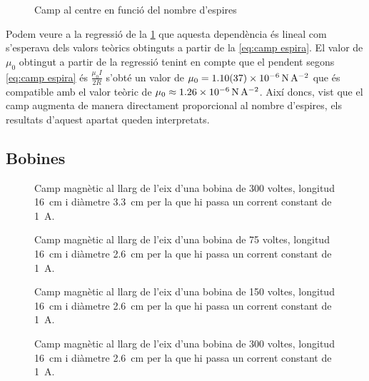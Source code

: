 \begin{figure}[htb]
  \centering
  \caption{Camp al centre en funció del nombre d'espires}
  \label{fig:camp vs n}
\end{figure}

Podem veure a la regressió de la \cref{fig:camp vs n} que aquesta dependència és lineal com s'esperava dels valors teòrics obtinguts a partir de la \cref{eq:camp espira}. El valor de $\mu_{0}$ obtingut a partir de la regressió tenint en compte que el pendent segons \cref{eq:camp espira} és $\frac{\mu_{0}I}{2R}$  s'obté un valor de $\mu_{0} = \data{1.10}{0.37d-6}{N.A^{-2}} $ que és compatible amb el valor teòric de $\mu_{0}\approx \SI{1.26d-6}{N.A^{-2}} $. Així doncs, vist que el camp augmenta de manera directament proporcional al nombre d'espires, els resultats d'aquest apartat queden interpretats.

\subsection{Bobines}\label{sec:bobines}
\begin{figure}[tp]
	\sffamily \small
	\centering
	
	\caption{Camp magnètic al llarg de l'eix d'una bobina de 300 voltes, longitud \SI{16}{cm} i diàmetre \SI{3.3}{cm} per la que hi passa un corrent constant de \SI{1}{A}.}
	\label{fig:camp 300/33}
\end{figure}

\begin{figure}[tp]
	\sffamily \small
	\centering
	
	\caption{Camp magnètic al llarg de l'eix d'una bobina de 75 voltes, longitud \SI{16}{cm} i diàmetre \SI{2.6}{cm} per la que hi passa un corrent constant de \SI{1}{A}.}
	\label{fig:camp 75/26}
\end{figure}

\begin{figure}[tp]
	\sffamily \small
	\centering
	
	\caption{Camp magnètic al llarg de l'eix d'una bobina de 150 voltes, longitud \SI{16}{cm} i diàmetre \SI{2.6}{cm} per la que hi passa un corrent constant de \SI{1}{A}.}
	\label{fig:camp 150/26}
\end{figure}

\begin{figure}[tp]
	\sffamily \small
	\centering
	
	\caption{Camp magnètic al llarg de l'eix d'una bobina de 300 voltes, longitud \SI{16}{cm} i diàmetre \SI{2.6}{cm} per la que hi passa un corrent constant de \SI{1}{A}.}
	\label{fig:camp 300/26}
\end{figure}

